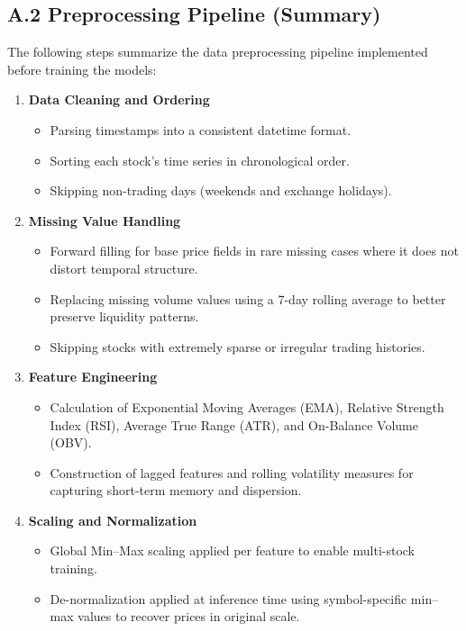 \subsection*{A.2 Preprocessing Pipeline (Summary)}

The following steps summarize the data preprocessing pipeline implemented before training the models:

\begin{enumerate}
    \item \textbf{Data Cleaning and Ordering}
    \begin{itemize}
        \item Parsing timestamps into a consistent datetime format.
        \item Sorting each stock's time series in chronological order.
        \item Skipping non-trading days (weekends and exchange holidays).
    \end{itemize}

    \item \textbf{Missing Value Handling}
    \begin{itemize}
        \item Forward filling for base price fields in rare missing cases where it does not distort temporal structure.
        \item Replacing missing volume values using a 7-day rolling average to better preserve liquidity patterns.
        \item Skipping stocks with extremely sparse or irregular trading histories.
    \end{itemize}

    \item \textbf{Feature Engineering}
    \begin{itemize}
        \item Calculation of Exponential Moving Averages (EMA), Relative Strength Index (RSI), Average True Range (ATR), and On-Balance Volume (OBV).
        \item Construction of lagged features and rolling volatility measures for capturing short-term memory and dispersion.
    \end{itemize}

    \item \textbf{Scaling and Normalization}
    \begin{itemize}
        \item Global Min--Max scaling applied per feature to enable multi-stock training.
        \item De-normalization applied at inference time using symbol-specific min--max values to recover prices in original scale.
    \end{itemize}


\end{enumerate}

